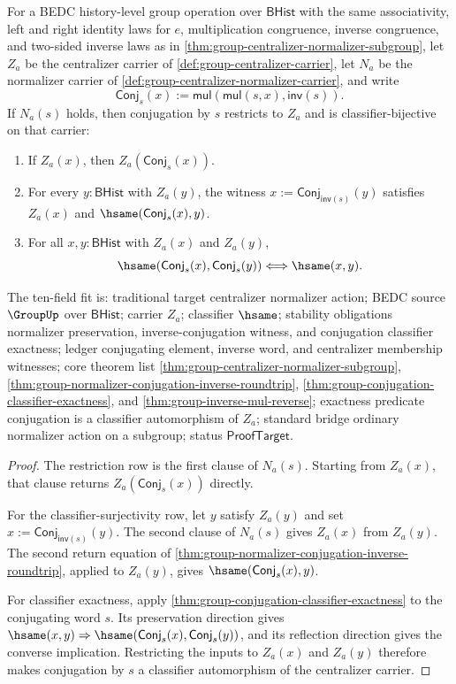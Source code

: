 \begin{theorem}
\label{thm:group-centralizer-normalizer-conjugation-automorphism}
For a BEDC history-level group operation over $\mathsf{BHist}$ with the same
associativity, left and right identity laws for $e$, multiplication
congruence, inverse congruence, and two-sided inverse laws as in
\autoref{thm:group-centralizer-normalizer-subgroup}, let $Z_a$ be the
centralizer carrier of \autoref{def:group-centralizer-carrier}, let $N_a$ be
the normalizer carrier of \autoref{def:group-centralizer-normalizer-carrier},
and write
$$
\mathsf{Conj}_s(x):=
\mathsf{mul}(\mathsf{mul}(s,x),\mathsf{inv}(s)).
$$
If $N_a(s)$ holds, then conjugation by $s$ restricts to $Z_a$ and is
classifier-bijective on that carrier:
\begin{enumerate}
\item If $Z_a(x)$, then $Z_a(\mathsf{Conj}_s(x))$.
\item For every $y:\mathsf{BHist}$ with $Z_a(y)$, the witness
$x:=\mathsf{Conj}_{\mathsf{inv}(s)}(y)$ satisfies $Z_a(x)$ and
$\hsame(\mathsf{Conj}_s(x),y)$.
\item For all $x,y:\mathsf{BHist}$ with $Z_a(x)$ and $Z_a(y)$,
$$
\hsame(\mathsf{Conj}_s(x),\mathsf{Conj}_s(y))
\Longleftrightarrow
\hsame(x,y).
$$
\end{enumerate}
The ten-field fit is: traditional target centralizer normalizer action; BEDC
source $\GroupUp$ over $\mathsf{BHist}$; carrier $Z_a$; classifier $\hsame$;
stability obligations normalizer preservation, inverse-conjugation witness,
and conjugation classifier exactness; ledger conjugating element, inverse
word, and centralizer membership witnesses; core theorem list
\autoref{thm:group-centralizer-normalizer-subgroup},
\autoref{thm:group-normalizer-conjugation-inverse-roundtrip},
\autoref{thm:group-conjugation-classifier-exactness}, and
\autoref{thm:group-inverse-mul-reverse}; exactness predicate conjugation is a
classifier automorphism of $Z_a$; standard bridge ordinary normalizer action
on a subgroup; status $\mathsf{ProofTarget}$.
\end{theorem}
\begin{proof}
The restriction row is the first clause of $N_a(s)$. Starting from
$Z_a(x)$, that clause returns $Z_a(\mathsf{Conj}_s(x))$ directly.

For the classifier-surjectivity row, let $y$ satisfy $Z_a(y)$ and set
$x:=\mathsf{Conj}_{\mathsf{inv}(s)}(y)$. The second clause of $N_a(s)$ gives
$Z_a(x)$ from $Z_a(y)$. The second return equation of
\autoref{thm:group-normalizer-conjugation-inverse-roundtrip}, applied to
$Z_a(y)$, gives $\hsame(\mathsf{Conj}_s(x),y)$.

For classifier exactness, apply
\autoref{thm:group-conjugation-classifier-exactness} to the conjugating word
$s$. Its preservation direction gives
$\hsame(x,y)\Rightarrow
\hsame(\mathsf{Conj}_s(x),\mathsf{Conj}_s(y))$, and its reflection direction
gives the converse implication. Restricting the inputs to $Z_a(x)$ and
$Z_a(y)$ therefore makes conjugation by $s$ a classifier automorphism of the
centralizer carrier.
\end{proof}

